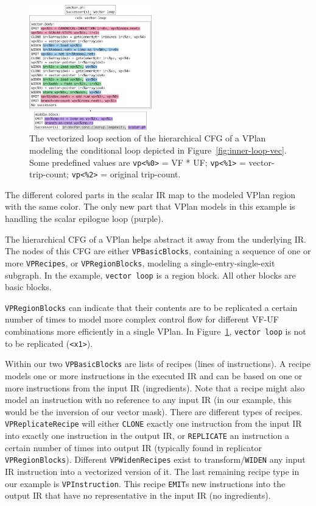 \documentclass[sigplan,11pt,nonacm]{acmart}
\begin{document}
\begin{figure}
  \centering
  \includegraphics[width=0.475\textwidth]{images/inner-loop-vplan-hcfg-loop-body-color.png}
  \caption{The vectorized loop section of the hierarchical CFG of a VPlan modeling the conditional loop
  depicted in Figure~\ref{fig:inner-loop-vec}. Some predefined values are
  \texttt{vp<\%0>} = VF * UF; \texttt{vp<\%1>} = vector-trip-count; \texttt{vp<\%2>} = original trip-count.}
  \label{fig:inner-loop-vplan-hcfg-body}
\end{figure}

The different colored parts in the scalar IR map to the modeled VPlan region with the same color.
The only new part that VPlan models in this example is handling the scalar epilogue loop (purple).

The hierarchical CFG of a VPlan helps abstract it away from the underlying IR. The nodes of this CFG
are either \texttt{VPBasicBlocks}, containing a sequence of one or more \texttt{VPRecipes}, or
\texttt{VPRegionBlocks}, modeling a single-entry-single-exit subgraph.
In the example, \texttt{vector loop} is a region block. All other blocks are basic blocks.

\texttt{VPRegionBlocks} can indicate that their contents are to be replicated a certain number of times
to model more complex control flow for different VF-UF combinations more efficiently in a single VPlan. 
In Figure~\ref{fig:inner-loop-vplan-hcfg-body}, \texttt{vector loop} is not to be replicated (\texttt{<x1>}).

Within our two \texttt{VPBasicBlocks} are lists of recipes (lines of instructions). A recipe
models one or more instructions in the executed IR and can be based on one or more instructions
from the input IR (ingredients). Note that a recipe might also model an instruction with no reference to any input
IR (in our example, this would be the inversion of our vector mask). There are different types of 
recipes. \texttt{VPReplicateRecipe} will either \texttt{CLONE} exactly one instruction from the input IR
into exactly one instruction in the output IR, or \texttt{REPLICATE} an instruction a certain number
of times into output IR (typically found in replicator \texttt{VPRegionBlocks}). Different 
\texttt{VPWidenRecipes} exist to transform/\texttt{WIDEN} any input IR instruction into a vectorized 
version of it. The last remaining recipe type in our example is \texttt{VPInstruction}. This recipe
\texttt{EMIT}s new instructions into the output IR that have no representative in the input IR (no
ingredients).
\end{document}
